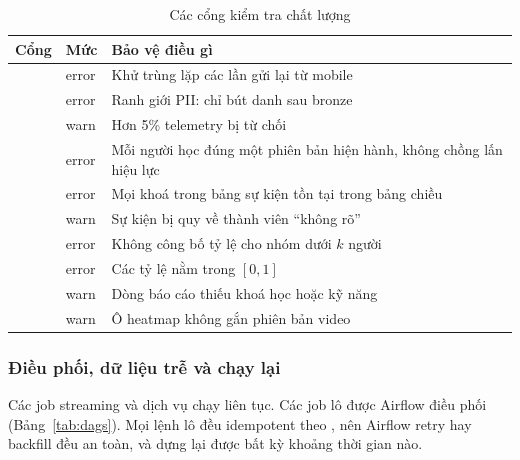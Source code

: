 \begin{table}[H]
\centering\small
\caption{Các cổng kiểm tra chất lượng}\label{tab:dq}
\begin{tabularx}{\textwidth}{@{}L{5.6cm}L{1.6cm}Y@{}}
\toprule
\textbf{Cổng} & \textbf{Mức} & \textbf{Bảo vệ điều gì} \\
\midrule
{} & error & Khử trùng lặp các lần gửi lại từ mobile \\
 & error & Ranh giới PII: chỉ bút danh sau bronze \\
 & warn & Hơn 5\% telemetry bị từ chối \\
 & error & Mỗi người học đúng một phiên bản hiện hành, không chồng lấn hiệu lực \\
 & error & Mọi khoá trong bảng sự kiện tồn tại trong bảng chiều \\
 & warn & Sự kiện bị quy về thành viên ``không rõ'' \\
 & error & Không công bố tỷ lệ cho nhóm dưới $k$ người \\
 & error & Các tỷ lệ nằm trong $[0, 1]$ \\
 & warn & Dòng báo cáo thiếu khoá học hoặc kỹ năng \\
 & warn & Ô heatmap không gắn phiên bản video \\
\bottomrule
\end{tabularx}
\end{table}

\subsubsection{Điều phối, dữ liệu trễ và chạy lại}
\label{sec:late}

Các job streaming và dịch vụ chạy liên tục. Các job lô được Airflow điều phối (Bảng~\ref{tab:dags}). Mọi lệnh lô đều idempotent theo , nên Airflow retry hay backfill đều an toàn, và  dựng lại được bất kỳ khoảng thời gian nào.

